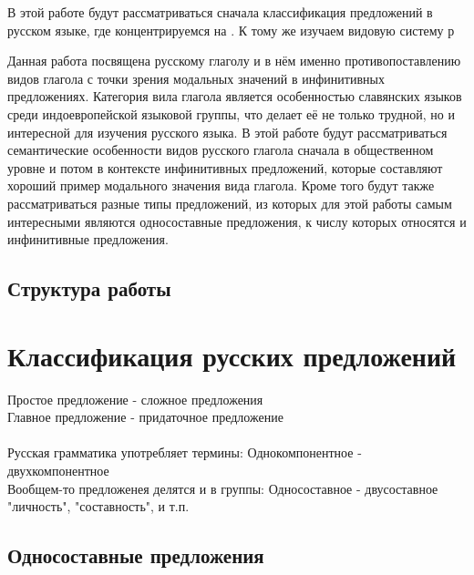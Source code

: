 \documentclass{article}
\begin{document}
В этой работе будут рассматриваться сначала классификация предложений в русском языке, где концентрируемся на . К тому же изучаем  видовую систему р



Данная работа посвящена русскому глаголу и в нём именно противопоставлению видов глагола с точки зрения модальных значений в инфинитивных предложениях. Категория вила глагола является особенностью славянских языков среди индоевропейской языковой группы, что делает её не только трудной, но и интересной для изучения русского языка. В этой работе будут рассматриваться семантические особенности видов русского глагола сначала в общественном уровне и потом в контексте инфинитивных предложений, которые составляют хороший пример модального значения вида глагола. Кроме того будут также рассматриваться разные типы предложений, из которых для этой работы самым интересными являются односоставные предложения, к числу которых относятся и инфинитивные предложения.


\subsection{Структура работы}


\section{Классификация русских предложений}

Простое предложение - сложное предложения \\
Главное предложение - придаточное предложение \\
\\

Русская грамматика употребляет термины:
Однокомпонентное - двухкомпонентное \\

Вообщем-то предложенея делятся и в группы:
Односоставное - двусоставное \\

"личность", "составность", и т.п.

\subsection{Односоставные предложения}
\end{document}
